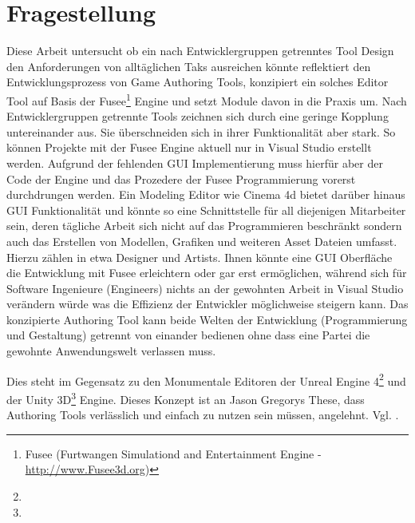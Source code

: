 \documentclass[pagesize, paper=a4, fontsize=12pt, titlepage=true, headings=small, headnosepline, abstractoff, liststotoc, nochapterprefix, plainheadsepline, twoside]{scrreprt}
\begin{document}
\section{Fragestellung}
Diese Arbeit untersucht ob ein nach Entwicklergruppen getrenntes Tool Design den Anforderungen von alltäglichen Taks ausreichen könnte reflektiert den Entwicklungsprozess von Game Authoring Tools, konzipiert ein solches Editor Tool auf Basis der Fusee\footnote{Fusee (Furtwangen Simulationd and Entertainment Engine - \url{http://www.Fusee3d.org})} Engine und setzt Module davon in die Praxis um. Nach Entwicklergruppen getrennte Tools zeichnen sich durch eine geringe Kopplung untereinander aus. Sie überschneiden sich in ihrer Funktionalität aber stark. So können Projekte mit der Fusee Engine aktuell nur in Visual Studio erstellt werden. Aufgrund der fehlenden GUI Implementierung muss hierfür aber der Code der Engine und das Prozedere der Fusee Programmierung vorerst durchdrungen werden. Ein Modeling Editor wie Cinema 4d bietet darüber hinaus GUI Funktionalität und könnte so eine Schnittstelle für all diejenigen Mitarbeiter sein, deren tägliche Arbeit sich nicht auf das Programmieren beschränkt sondern auch das Erstellen von Modellen, Grafiken und weiteren Asset Dateien umfasst. Hierzu zählen in etwa Designer und Artists. Ihnen könnte eine GUI Oberfläche die Entwicklung mit Fusee erleichtern oder gar erst ermöglichen, während sich für Software Ingenieure (Engineers) nichts an der gewohnten Arbeit in Visual Studio verändern würde was die Effizienz der Entwickler möglichweise steigern kann. Das konzipierte Authoring Tool kann beide Welten der Entwicklung (Programmierung und Gestaltung) getrennt von einander bedienen ohne dass eine Partei die gewohnte Anwendungswelt verlassen muss.

Dies steht im Gegensatz zu den Monumentale Editoren der Unreal Engine 4\footnote{} und der Unity 3D\footnote{} Engine. 
Dieses Konzept ist an Jason Gregorys These, dass Authoring Tools verlässlich und einfach zu nutzen sein müssen, angelehnt. Vgl. .
\end{document}
